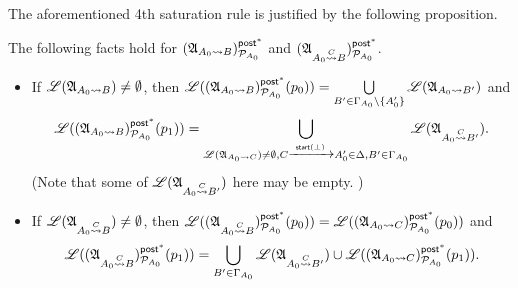  

The aforementioned 4th saturation rule is justified by the following proposition. 

\begin{proposition} \label{prop-lm-A0-post}
The following facts hold for $({\mathfrak{A} }_{A_0 \rightsquigarrow B})^{{\mathsf{post} }^*}_{{\mathcal{P} }_{A_0}}$ and $({\mathfrak{A} }_{A_0\stackrel{C}\rightsquigarrow B})^{{\mathsf{post} }^*}_{{\mathcal{P} }_{A_0}}$.
\begin{itemize}
    \item If $ {\mathscr{L} }({\mathfrak{A} }_{A_0 \rightsquigarrow B}) \neq \emptyset$, then ${\mathscr{L} }(({\mathfrak{A} }_{A_0 \rightsquigarrow B})^{{\mathsf{post} }^*}_{{\mathcal{P} }_{A_0}}(p_0)) = \bigcup\limits_{B' \in \Gamma_{A_0}\setminus\{A_0'\}} {\mathscr{L} }({\mathfrak{A} }_{A_0\rightsquigarrow B'})$ and
    $${\mathscr{L} }(({\mathfrak{A} }_{A_0 \rightsquigarrow B})^{{\mathsf{post} }^*}_{{\mathcal{P} }_{A_0}}(p_1))  = \bigcup\limits_{{\mathscr{L} }({\mathfrak{A} }_{A_0\rightsquigarrow C})\neq\emptyset,C \xrightarrow{{\mathsf{start} }(\bot)}A'_0 \in \Delta, B' \in \Gamma_{A_0}} {\mathscr{L} }({\mathfrak{A} }_{A_0\stackrel{C}\rightsquigarrow B'}).$$
        (Note that some of ${\mathscr{L} }({\mathfrak{A} }_{A_0\stackrel{C}\rightsquigarrow B'})$ here may be empty. ) 
%

%
    \item If $ {\mathscr{L} }({\mathfrak{A} }_{A_0\stackrel{C}\rightsquigarrow B}) \neq \emptyset$, then ${\mathscr{L} }(({\mathfrak{A} }_{A_0\stackrel{C}\rightsquigarrow B})^{{\mathsf{post} }^*}_{{\mathcal{P} }_{A_0}}(p_0)) = {\mathscr{L} }(({\mathfrak{A} }_{A_0 \rightsquigarrow C})^{{\mathsf{post} }^*}_{{\mathcal{P} }_{A_0}}(p_0))$ and 
    $${\mathscr{L} }(({\mathfrak{A} }_{A_0\stackrel{C}\rightsquigarrow B})^{{\mathsf{post} }^*}_{{\mathcal{P} }_{A_0}}(p_1)) = 
    \bigcup\limits_{B'\in\Gamma_{A_0}}{\mathscr{L} }({\mathfrak{A} }_{A_0\stackrel{C}\rightsquigarrow B'}) \cup  {\mathscr{L} }(({\mathfrak{A} }_{A_0 \rightsquigarrow C})^{{\mathsf{post} }^*}_{{\mathcal{P} }_{A_0}}(p_1)).$$
\end{itemize}
\end{proposition}

